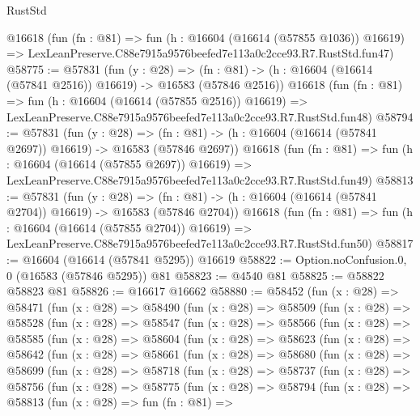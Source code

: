 \begin{lexlean}{RustStd}
\begin{coremodule}
    @16618
    (fun (fn : @81) =>
    fun (h : @16604 (@16614 (@57855 @1036)) @16619) =>
    LexLeanPreserve.C88e7915a9576beefed7e113a0c2cce93.R7.RustStd.fun47)
@58775 := @57831
    (fun (y : @28) =>
    (fn : @81) -> (h : @16604 (@16614 (@57841 @2516)) @16619) -> @16583 (@57846 @2516))
    @16618
    (fun (fn : @81) =>
    fun (h : @16604 (@16614 (@57855 @2516)) @16619) =>
    LexLeanPreserve.C88e7915a9576beefed7e113a0c2cce93.R7.RustStd.fun48)
@58794 := @57831
    (fun (y : @28) =>
    (fn : @81) -> (h : @16604 (@16614 (@57841 @2697)) @16619) -> @16583 (@57846 @2697))
    @16618
    (fun (fn : @81) =>
    fun (h : @16604 (@16614 (@57855 @2697)) @16619) =>
    LexLeanPreserve.C88e7915a9576beefed7e113a0c2cce93.R7.RustStd.fun49)
@58813 := @57831
    (fun (y : @28) =>
    (fn : @81) -> (h : @16604 (@16614 (@57841 @2704)) @16619) -> @16583 (@57846 @2704))
    @16618
    (fun (fn : @81) =>
    fun (h : @16604 (@16614 (@57855 @2704)) @16619) =>
    LexLeanPreserve.C88e7915a9576beefed7e113a0c2cce93.R7.RustStd.fun50)
@58817 := @16604 (@16614 (@57841 @5295)) @16619
@58822 := Option.noConfusion.{0, 0} (@16583 (@57846 @5295)) @81
@58823 := @4540 @81
@58825 := @58822 @58823 @81
@58826 := @16617 @16662
@58880 := @58452
    (fun (x : @28) =>
    @58471
      (fun (x : @28) =>
      @58490
        (fun (x : @28) =>
        @58509
          (fun (x : @28) =>
          @58528
            (fun (x : @28) =>
            @58547
              (fun (x : @28) =>
              @58566
                (fun (x : @28) =>
                @58585
                  (fun (x : @28) =>
                  @58604
                    (fun (x : @28) =>
                    @58623
                      (fun (x : @28) =>
                      @58642
                        (fun (x : @28) =>
                        @58661
                          (fun (x : @28) =>
                          @58680
                            (fun (x : @28) =>
                            @58699
                              (fun (x : @28) =>
                              @58718
                                (fun (x : @28) =>
                                @58737
                                  (fun (x : @28) =>
                                  @58756
                                    (fun (x : @28) =>
                                    @58775
                                      (fun (x : @28) =>
                                      @58794
                                        (fun (x : @28) =>
                                        @58813
                                          (fun (x : @28) =>
                                          fun (fn : @81) =>

\end{coremodule}
\end{lexlean}
